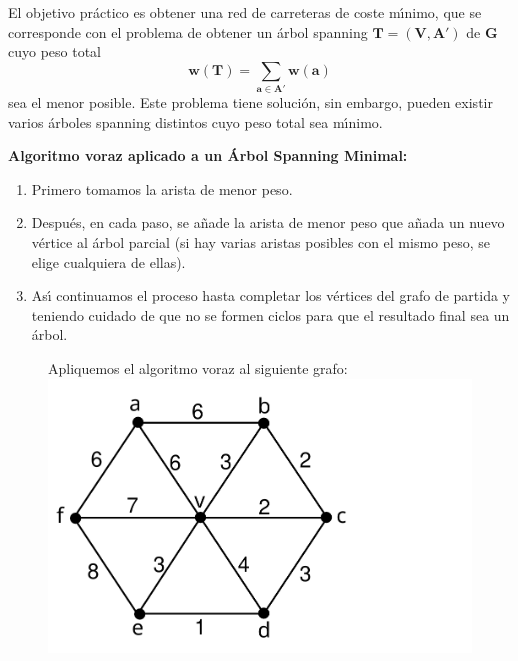 \documentclass[ebook,oneside]{memoir}
\newcommand{\bolds}[1]{\boldsymbol{#1}}
\begin{document}
El objetivo pr\'{a}ctico es obtener una red de carreteras de coste m\'{\i}nimo, que se corresponde con el problema de obtener un \'{a}rbol spanning $\bolds{T=(V,A')}$ de $\bolds{G}$ cuyo peso total $$\bolds{w(T)=\sum_{a\in A'}w(a)}$$ sea el menor posible. Este problema tiene soluci\'{o}n, sin embargo, pueden existir varios \'{a}rboles spanning distintos cuyo peso total sea m\'{\i}nimo.
\vspace{0.6cm}

\noindent\textbf{Algoritmo voraz aplicado a un \'{A}rbol Spanning Minimal:}
\vspace{0.3cm}

        \begin{enumerate}
            \item Primero tomamos la arista de menor peso.
            \item Despu\'{e}s, en cada paso, se a\~{n}ade la arista de menor peso que a\~{n}ada un nuevo v\'{e}rtice al \'{a}rbol parcial
            (si hay varias aristas posibles con el mismo peso, se elige cualquiera de ellas).
            \item As\'{\i} con\-ti\-nua\-mos el proceso hasta completar los v\'{e}rtices del grafo de partida y teniendo cuidado de que no se formen ciclos
            para que el resultado final sea un \'{a}rbol.
        \end{enumerate}

\vspace{0.2cm}

      \begin{center}
           \begin{figure}[h!]\centering
           \noindent Apliquemos el algoritmo voraz al siguiente grafo:
           \includegraphics[scale=0.2]{ASMb.pdf}
           \end{figure}
      \end{center}
\end{document}
